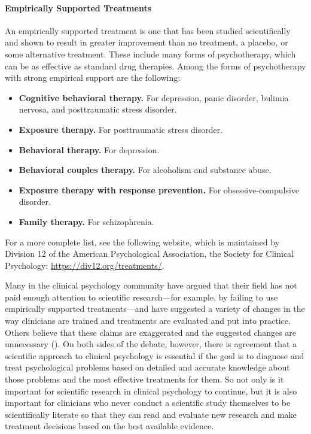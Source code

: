 \documentclass[
]{krantz}
\providecommand{\tightlist}{%
  \setlength{\itemsep}{0pt}\setlength{\parskip}{0pt}}
\begin{document}
\paragraph*{Empirically Supported Treatments}\label{empirically-supported-treatments}

An empirically supported treatment is one that has been studied scientifically and shown to result in greater improvement than no treatment, a placebo, or some alternative treatment. These include many forms of psychotherapy, which can be as effective as standard drug therapies. Among the forms of psychotherapy with strong empirical support are the following:

\begin{itemize}
\tightlist
\item
  \textbf{Cognitive behavioral therapy.} For depression, panic disorder, bulimia nervosa, and posttraumatic stress disorder.
\item
  \textbf{Exposure therapy.} For posttraumatic stress disorder.
\item
  \textbf{Behavioral therapy.} For depression.
\item
  \textbf{Behavioral couples therapy.} For alcoholism and substance abuse.
\item
  \textbf{Exposure therapy with response prevention.} For obsessive-compulsive disorder.
\item
  \textbf{Family therapy.} For schizophrenia.
\end{itemize}

For a more complete list, see the following website, which is maintained by Division 12 of the American Psychological Association, the Society for Clinical Psychology: \url{https://div12.org/treatments/}.

Many in the clinical psychology community have argued that their field has not paid enough attention to scientific research---for example, by failing to use empirically supported treatments---and have suggested a variety of changes in the way clinicians are trained and treatments are evaluated and put into practice. Others believe that these claims are exaggerated and the suggested changes are unnecessary (). On both sides of the debate, however, there is agreement that a scientific approach to clinical psychology is essential if the goal is to diagnose and treat psychological problems based on detailed and accurate knowledge about those problems and the most effective treatments for them. So not only is it important for scientific research in clinical psychology to continue, but it is also important for clinicians who never conduct a scientific study themselves to be scientifically literate so that they can read and evaluate new research and make treatment decisions based on the best available evidence.
\end{document}
